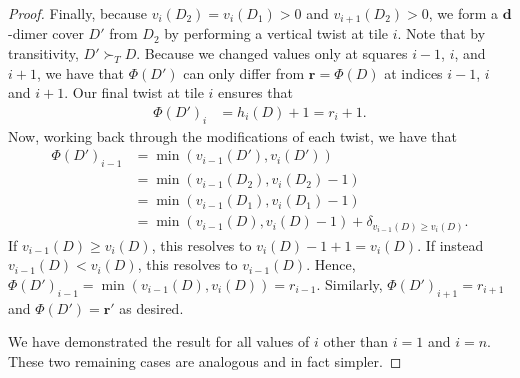 \documentclass{amsart}
\def\bfd{{\mathbf{d}}}
\def\bfr{{\mathbf{r}}}
\theoremstyle{definition}
\begin{document}
\begin{proof}
Finally, because $v_i(D_2)=v_i(D_1)>0$ and $v_{i+1}(D_2)>0$, we form a $\bfd$-dimer cover $D'$ from $D_2$ by performing a vertical twist at tile $i$. Note that by transitivity, $D'\succ_T D$.
Because we changed values only at squares $i-1$, $i$, and $i+1$, we have that $\Phi(D')$ can only differ from $\bfr=\Phi(D)$ at indices $i-1$, $i$ and $i+1$. Our final twist at tile $i$ ensures that 
\begin{align*}
    \Phi(D')_i&=h_i(D)+1=r_i+1.
\end{align*}
Now, working back through the modifications of each twist, we have that
\begin{align*}
    \Phi(D')_{i-1}&=\min(v_{i-1}(D'),v_{i}(D'))\\
    &=\min(v_{i-1}(D_2),v_i(D_2)-1)\\
    &=\min(v_{i-1}(D_1),v_i(D_1)-1)\\
    &=\min(v_{i-1}(D),v_i(D)-1)+\delta_{v_{i-1}(D)\geq v_i(D)}.
\end{align*}
If $v_{i-1}(D)\geq v_i(D)$, this resolves to $v_{i}(D)-1+1=v_{i}(D)$.
If instead $v_{i-1}(D)< v_i(D)$, this resolves to $v_{i-1}(D)$. Hence, $\Phi(D')_{i-1}=\min(v_{i-1}(D),v_i(D))=r_{i-1}$. Similarly, $\Phi(D')_{i+1}=r_{i+1}$ and $\Phi(D')=\bfr'$ as desired.

We have demonstrated the result for all values of $i$ other than $i=1$ and $i=n$. These two remaining cases are analogous and in fact simpler. \qedhere

\end{proof}
\end{document}
